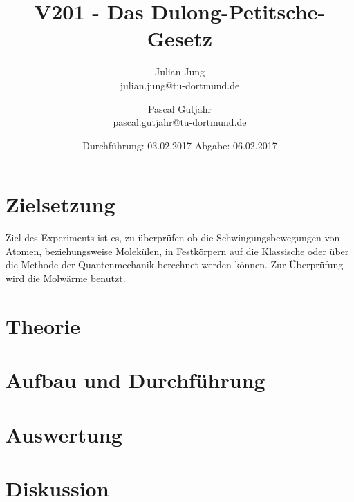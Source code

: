 

\title{V201 - Das Dulong-Petitsche-Gesetz}
\author{Julian Jung \\ julian.jung@tu-dortmund.de
  \and Pascal Gutjahr \\ pascal.gutjahr@tu-dortmund.de}
  \date{Durchführung: 03.02.2017
  \hspace{3em}
  Abgabe: 06.02.2017}
  
\maketitle
\newpage
\tableofcontents
\newpage
\section{Zielsetzung}
Ziel des Experiments ist es, zu überprüfen ob die Schwingungsbewegungen von
Atomen, beziehungsweise Molekülen, in Festkörpern auf die Klassische oder über
die Methode der Quantenmechanik berechnet werden können. Zur Überprüfung wird
die Molwärme benutzt.
\section{Theorie}
 
\section{Aufbau und Durchführung}
 
\section{Auswertung}
 
\section{Diskussion}
 
\printbibliography

